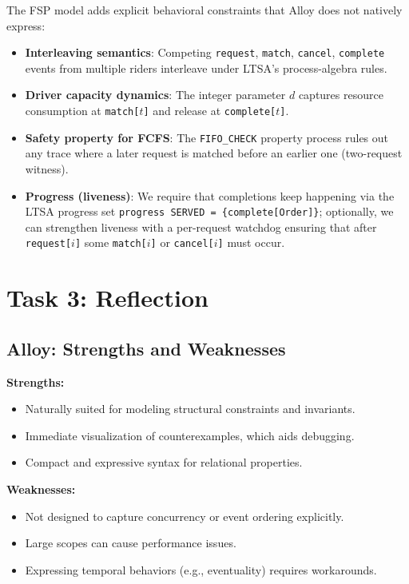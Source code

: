 \documentclass[11pt]{article}
\begin{document}
The FSP model adds explicit behavioral constraints that Alloy does not natively express:
\begin{itemize}[leftmargin=1.5em]
  \item \textbf{Interleaving semantics}: Competing \texttt{request}, \texttt{match}, \texttt{cancel}, \texttt{complete} events from multiple riders interleave under LTSA’s process-algebra rules.
  \item \textbf{Driver capacity dynamics}: The integer parameter $d$ captures resource consumption at \texttt{match[$t$]} and release at \texttt{complete[$t$]}.
  \item \textbf{Safety property for FCFS}: The \texttt{FIFO\_CHECK} property process rules out any trace where a later request is matched before an earlier one (two-request witness).
  \item \textbf{Progress (liveness)}: We require that completions keep happening via the LTSA progress set \texttt{progress SERVED = \{complete[Order]\}}; optionally, we can strengthen liveness with a per-request watchdog ensuring that after \texttt{request[$i$]} some \texttt{match[$i$]} or \texttt{cancel[$i$]} must occur.
\end{itemize}

\section{Task 3: Reflection}
\label{sec:task3}

\subsection{Alloy: Strengths and Weaknesses}

\textbf{Strengths:}
\begin{itemize}[leftmargin=1.5em]
  \item Naturally suited for modeling structural constraints and invariants.
  \item Immediate visualization of counterexamples, which aids debugging.
  \item Compact and expressive syntax for relational properties.
\end{itemize}
\textbf{Weaknesses:}
\begin{itemize}[leftmargin=1.5em]
  \item Not designed to capture concurrency or event ordering explicitly.
  \item Large scopes can cause performance issues.
  \item Expressing temporal behaviors (e.g., eventuality) requires workarounds.
\end{itemize}
\end{document}
